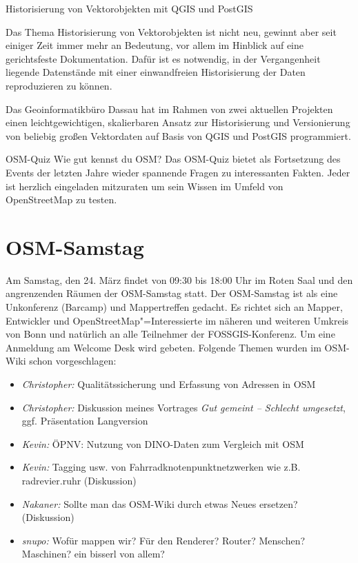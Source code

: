 
%
{Historisierung von Vektorobjekten mit QGIS und PostGIS}%
{}%
{%
Das Thema Historisierung von Vektorobjekten ist nicht neu, gewinnt aber seit
einiger Zeit immer mehr an Bedeutung, vor allem im Hinblick auf eine
gerichtsfeste Dokumentation. Dafür ist es notwendig, in der Vergangenheit
liegende Datenstände mit einer einwandfreien Historisierung der Daten
reproduzieren zu können.

Das Geoinformatikbüro Dassau hat im Rahmen von zwei aktuellen Projekten einen
leichtgewichtigen, skalierbaren Ansatz zur Historisierung und Versionierung von
beliebig großen Vektordaten auf Basis von QGIS und PostGIS programmiert.%
}

%
{OSM-Quiz}%
{Wie gut kennst du OSM?}%
{Das OSM-Quiz bietet als Fortsetzung des Events der letzten Jahre wieder spannende Fragen zu
interessanten Fakten. Jeder ist herzlich eingeladen mitzuraten um sein Wissen im Umfeld von
OpenStreetMap zu testen.}


\newpage


\newpage
\section*{OSM-Samstag}
\pagestyle{cropmarksstyle}
\label{osm-samstag}
Am Samstag, den 24. März findet von 09:30 bis 18:00 Uhr im Roten Saal und den angrenzenden Räumen der OSM-Samstag statt.
Der OSM-Samstag ist als eine Unkonferenz (Barcamp) und Mappertreffen gedacht.
Es richtet sich an Mapper, Entwickler und OpenStreetMap"=Interessierte im näheren und
weiteren Umkreis von Bonn und natürlich an alle Teilnehmer der FOSSGIS-Konferenz. Um eine Anmeldung am Welcome Desk wird gebeten.
Folgende Themen wurden im OSM-Wiki schon vorgeschlagen:
\begin{itemize}
  \RaggedRight
  \setlength{\itemsep}{-1pt}
  \item \emph{Christopher:} Qualitätssicherung und Erfassung von Adressen in OSM
  \item \emph{Christopher:} Diskussion meines Vortrages \emph{Gut gemeint -- Schlecht umgesetzt}, ggf. Präsentation Langversion
  \item \emph{Kevin:} ÖPNV: Nutzung von DINO-Daten zum Vergleich mit OSM
  \item \emph{Kevin:} Tagging usw. von Fahrradknotenpunktnetzwerken wie z.B. radrevier.ruhr (Diskussion)
  \item \emph{Nakaner:} Sollte man das OSM-Wiki durch etwas Neues ersetzen? (Diskussion)
  \item \emph{snupo:} Wofür mappen wir? Für den Renderer? Router? Menschen? Maschinen? ein bisserl von allem?
\end{itemize}
\vfill
\justifying

